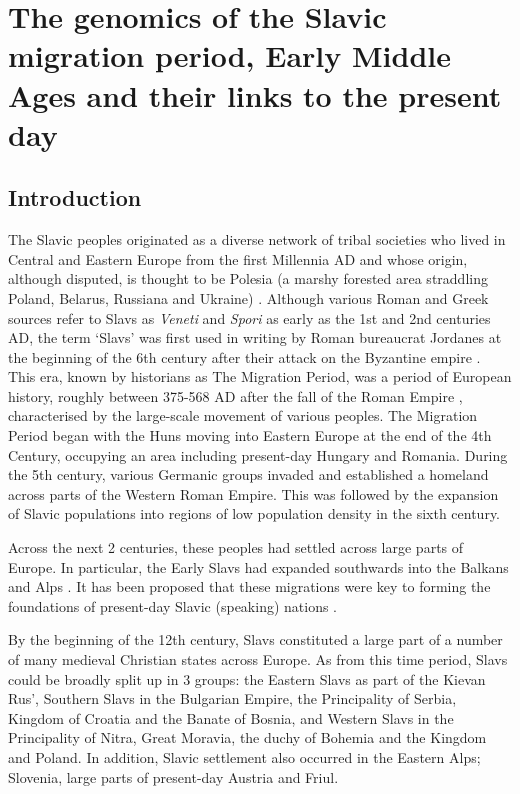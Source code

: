 \chapter{The genomics of the Slavic migration period, Early Middle Ages and their links to the present day}
\label{chapterlabel5}

\section{Introduction}

The Slavic peoples originated as a diverse network of tribal societies who lived in Central and Eastern Europe from the first Millennia AD \cite{barford2001early} and whose origin, although disputed, is thought to be Polesia (a marshy forested area straddling Poland, Belarus, Russiana and Ukraine) \cite{fouracre1995new}. Although various Roman and Greek sources refer to Slavs as \textit{Veneti} and \textit{Spori} as early as the 1st and 2nd centuries AD, the term `Slavs' was first used in writing by Roman bureaucrat Jordanes at the beginning of the 6th century after their attack on the Byzantine empire \cite{curta2006southeastern}. This era, known by historians as The Migration Period, was a period of European history, roughly between 375-568 AD after the fall of the Roman Empire \cite{halsall2007barbarian}, characterised by the large-scale movement of various peoples. The Migration Period began with the Huns moving into Eastern Europe at the end of the 4th Century, occupying an area including present-day Hungary and Romania. During the 5th century, various Germanic groups invaded and established a homeland across parts of the Western Roman Empire. This was followed by the expansion of Slavic populations into regions of low population density in the sixth century.

Across the next 2 centuries, these peoples had settled across large parts of Europe. In particular, the Early Slavs had expanded southwards into the Balkans and Alps \cite{barford2001early, brather2008archaologie, geary2003myth,gojda1991ancient}. It has been proposed that these migrations were key to forming the foundations of present-day Slavic (speaking) nations \cite{barford2001early}.  

By the beginning of the 12th century, Slavs constituted a large part of a number of many medieval Christian states across Europe. As from this time period, Slavs could be broadly split up in 3 groups: the Eastern Slavs as part of the Kievan Rus', Southern Slavs in the Bulgarian Empire, the Principality of Serbia, Kingdom of Croatia and the Banate of Bosnia, and Western Slavs in the Principality of Nitra, Great Moravia, the duchy of Bohemia and the Kingdom and Poland. In addition, Slavic settlement also occurred in the Eastern Alps; Slovenia, large parts of present-day Austria and Friul. 

